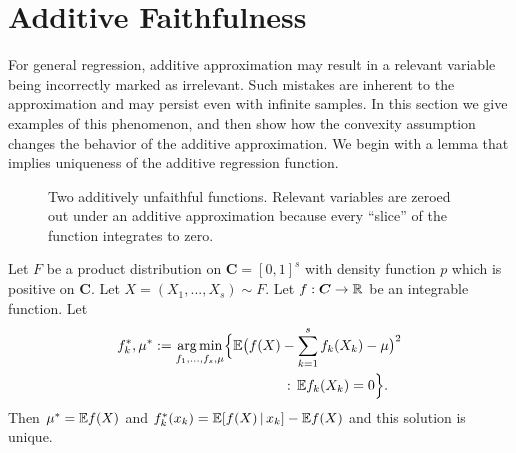 
\section{Additive Faithfulness}

For general regression, additive approximation may result in a
relevant variable being incorrectly marked as irrelevant. Such
mistakes are inherent to the approximation and may persist even with
infinite samples.  In this section we give
examples of this phenomenon, and then show how the convexity
assumption
changes the behavior of the additive approximation.  We begin
with a lemma that implies uniqueness of the additive regression function.


\begin{figure}[htp]
\vskip-10pt
	\centering
\caption{Two additively unfaithful functions. Relevant variables are
  zeroed out under an additive approximation because every ``slice''
  of the function integrates to zero.}
\vskip-10pt
\end{figure}


\begin{lemma}
\label{lem:general_int_reduction}
Let $F$ be a product distribution on $\mathbf{C}=[0,1]^s$ with density function $p$ which is positive on $\mathbf{C}$. Let
$X=(X_1,...,X_s) \sim F$. Let $f: \mbox{\boldmath $C$} \rightarrow \mathbb{R}$ be an
integrable function.
Let 
\begin{equation}
\begin{split}
f_k^*, \mu^* := \mathop{\text{\rm arg\,min}}_{f_1,\ldots, f_s, \mu} \Bigl\{ {\mathbb E} \bigl( f(X) & -
 \sum_{k=1}^s f_k(X_k) -\mu \bigr)^2 \\
       & \,:\, {\mathbb E} f_k(X_k) = 0\Bigr\}.
\end{split}
\end{equation}
Then $\mu^* = {\mathbb E} f(X)$ and $f^*_k(x_k) = {\mathbb E}[ f(X) {\,|\,} x_k] - {\mathbb E} f(X)$ and this solution is unique.
\end{lemma}

